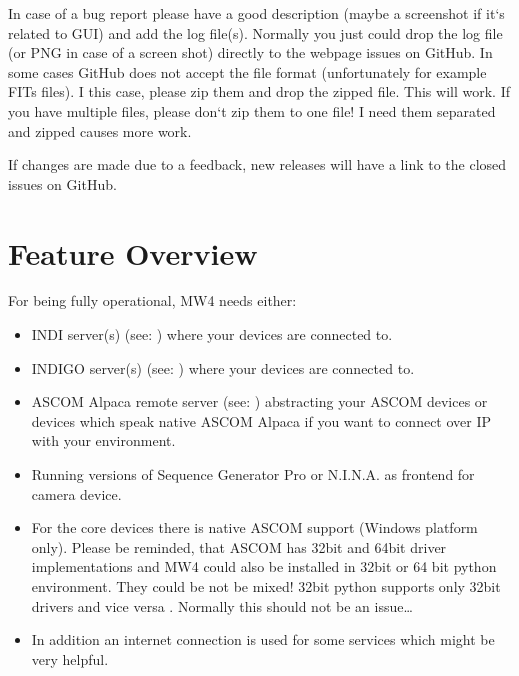 \documentclass[a4paper,10pt,english]{sphinxmanual}
\begin{document}
\sphinxAtStartPar
In case of a bug report please have a good description (maybe a screenshot if it‘s
related to GUI) and add the log file(s). Normally you just could drop the log file
(or PNG in case of a screen shot) directly to the webpage issues on GitHub. In
some cases GitHub does not accept the file format (unfortunately for example FITs
files). I this case, please zip them and drop the zipped file. This will work. If
you have multiple files, please don‘t zip them to one file! I need them separated
and zipped causes more work.

\sphinxAtStartPar
If changes are made due to a feedback, new releases will have a link to the closed
issues on GitHub.

\sphinxstepscope


\section{Feature Overview}
\label{\detokenize{features:feature-overview}}\label{\detokenize{features::doc}}
\sphinxAtStartPar
For being fully operational, MW4 needs either:
\begin{itemize}
\item {} 
\sphinxAtStartPar
INDI server(s) (see: ) where your devices are connected to.

\item {} 
\sphinxAtStartPar
INDIGO server(s) (see: ) where your devices
are connected to.

\item {} 
\sphinxAtStartPar
ASCOM Alpaca remote server (see: )
abstracting your ASCOM devices or devices which speak native ASCOM Alpaca if
you want to connect over IP with your environment.

\item {} 
\sphinxAtStartPar
Running versions of Sequence Generator Pro or N.I.N.A. as frontend for camera
device.

\item {} 
\sphinxAtStartPar
For the core devices there is native ASCOM support (Windows platform only).
Please be reminded, that ASCOM has 32bit and 64bit driver implementations
and MW4 could also be installed in 32bit or 64 bit python environment. They
could be not be mixed! 32bit python supports only 32bit drivers and vice versa
. Normally this should not be an issue…

\item {} 
\sphinxAtStartPar
In addition an internet connection is used for some services which might be
very helpful.

\end{itemize}
\end{document}
